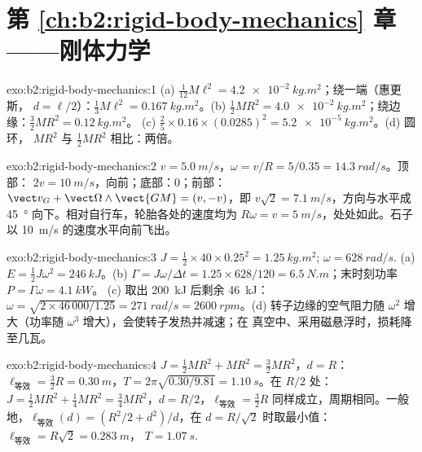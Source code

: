  \section*{第 \ref{ch:b2:rigid-body-mechanics} 章——刚体力学}

\begin{solution}{exo:b2:rigid-body-mechanics:1}
(a) $\tfrac1{12}M\ell^2 = \qty{4.2e-2}{kg.m^2}$；绕一端（惠更斯，
$d = \ell/2$）：$\tfrac13M\ell^2 = \qty{0.167}{kg.m^2}$。(b) $\tfrac12MR^2 =
\qty{4.0e-2}{kg.m^2}$；绕边缘：$\tfrac32MR^2 = \qty{0.12}{kg.m^2}$。
(c) $\tfrac25 \times 0.16 \times (0.0285)^2 = \qty{5.2e-5}{kg.m^2}$。(d) 圆环，
$MR^2$ 与 $\tfrac12MR^2$ 相比：两倍。
\end{solution}

\begin{solution}{exo:b2:rigid-body-mechanics:2}
$v = \qty{5.0}{m/s}$，$\omega = v/R = 5/0.35 = \qty{14.3}{rad/s}$。顶部：
$2v = \qty{10}{m/s}$，向前；底部：$0$；前部：$\vect v_G + \vect\Omega
\wedge\vect{GM} = (v, -v)$，即 $v\sqrt2 = \qty{7.1}{m/s}$，方向与水平成
\qty{45}{\degree} 向下。相对自行车，轮胎各处的速度均为
$R\omega = v = \qty{5}{m/s}$，处处如此。石子以 \qty{10}{m/s}
的速度水平向前飞出。
\end{solution}

\begin{solution}{exo:b2:rigid-body-mechanics:3}
$J = \tfrac12 \times 40 \times 0.25^2 = \qty{1.25}{kg.m^2}$; $\omega = \qty{628}{rad/s}$.
(a) $E = \tfrac12J\omega^2 = \qty{246}{kJ}$。(b) $\Gamma = J\omega/\Delta t =
1.25 \times 628/120 = \qty{6.5}{N.m}$；末时刻功率 $P = \Gamma\omega = \qty{4.1}{kW}$。
(c) 取出 \qty{200}{kJ} 后剩余 \qty{46}{kJ}：$\omega = \sqrt{2 \times 46\,000/1.25}
= \qty{271}{rad/s} = \qty{2600}{rpm}$。(d) 转子边缘的空气阻力随
$\omega^2$ 增大（功率随 $\omega^3$ 增大），会使转子发热并减速；在
真空中、采用磁悬浮时，损耗降至几瓦。
\end{solution}

\begin{solution}{exo:b2:rigid-body-mechanics:4}
$J = \tfrac12MR^2 + MR^2 = \tfrac32MR^2$，$d = R$：$\ell_{\text{等效}} = \tfrac32R
= \qty{0.30}{m}$，$T = 2\pi\sqrt{0.30/9.81} = \qty{1.10}{s}$。在 $R/2$ 处：$J =
\tfrac12MR^2 + \tfrac14MR^2 = \tfrac34MR^2$，$d = R/2$，$\ell_{\text{等效}} =
\tfrac32R$ 同样成立，周期相同。一般地，$\ell_{\text{等效}}(d) = (R^2/2 +
d^2)/d$，在 $d = R/\sqrt2$ 时取最小值：$\ell_{\text{等效}} = R\sqrt2 = \qty{0.283}{m}$，
$T = \qty{1.07}{s}$.
\end{solution}

